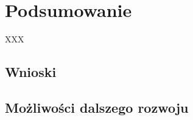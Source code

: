 \clearpage %

\section{Podsumowanie}

XXX

\subsection{Wnioski}

\subsection{Możliwości dalszego rozwoju}
